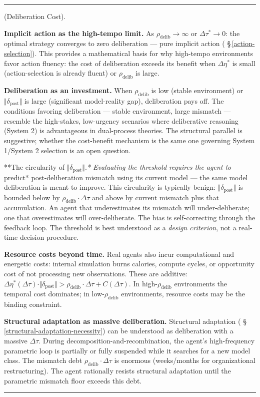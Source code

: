 \documentclass[11pt,oneside]{article}
\newcounter{claim}[section]
\renewcommand{\theclaim}{\thesection.\arabic{claim}}
\newenvironment{segment}[2]{%
  \refstepcounter{claim}%
  \bigskip\noindent\hrule\smallskip
  \noindent{\bfseries #1~\theclaim}\enskip(#2).\par\smallskip
  \noindent\ignorespaces
}{%
  \par\smallskip\noindent\hrule\bigskip
}
\newenvironment{proposition}[1][]{\begin{segment}{Proposition}{#1}}{\end{segment}}
\begin{document}
\begin{proposition}[Deliberation Cost]
\textbf{Implicit action as the high-tempo limit.} As $\rho_{\text{delib}} \to \infty$ or $\Delta\tau^* \to 0$: the optimal strategy converges to zero deliberation — pure implicit action ( \S\,\ref{action-selection}). This provides a mathematical basis for why high-tempo environments favor action fluency: the cost of deliberation exceeds its benefit when $\Delta\eta^*$ is small (action-selection is already fluent) or $\rho_{\text{delib}}$ is large.

\textbf{Deliberation as an investment.} When $\rho_{\text{delib}}$ is low (stable environment) or $\Vert\delta_{\text{post}}\Vert$ is large (significant model-reality gap), deliberation pays off. The conditions favoring deliberation — stable environment, large mismatch — resemble the high-stakes, low-urgency scenarios where deliberative reasoning (System 2) is advantageous in dual-process theories. The structural parallel is suggestive; whether the cost-benefit mechanism is the same one governing System 1/System 2 selection is an open question.

**The circularity of $\Vert\delta_{\text{post}}\Vert$.\textit{* Evaluating the threshold requires the agent to }predict* post-deliberation mismatch using its current model — the same model deliberation is meant to improve. This circularity is typically benign: $\Vert\delta_{\text{post}}\Vert$ is bounded below by $\rho_{\text{delib}} \cdot \Delta\tau$ and above by current mismatch plus that accumulation. An agent that underestimates its mismatch will under-deliberate; one that overestimates will over-deliberate. The bias is self-correcting through the feedback loop. The threshold is best understood as a \textit{design criterion}, not a real-time decision procedure.

\textbf{Resource costs beyond time.} Real agents also incur computational and energetic costs: internal simulation burns calories, compute cycles, or opportunity cost of not processing new observations. These are additive: $\Delta\eta^*(\Delta\tau) \cdot \Vert\delta_{\text{post}}\Vert > \rho_{\text{delib}} \cdot \Delta\tau + C(\Delta\tau)$. In high-$\rho_{\text{delib}}$ environments the temporal cost dominates; in low-$\rho_{\text{delib}}$ environments, resource costs may be the binding constraint.

\textbf{Structural adaptation as massive deliberation.} Structural adaptation ( \S\,\ref{structural-adaptation-necessity}) can be understood as deliberation with a massive $\Delta\tau$. During decomposition-and-recombination, the agent's high-frequency parametric loop is partially or fully suspended while it searches for a new model class. The mismatch debt $\rho_{\text{delib}} \cdot \Delta\tau$ is enormous (weeks/months for organizational restructuring). The agent rationally resists structural adaptation until the parametric mismatch floor exceeds this debt.


\end{proposition}
\end{document}
